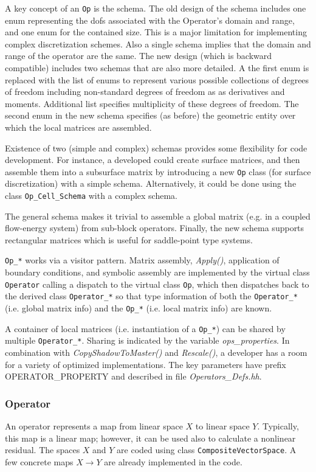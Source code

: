 A key concept of an {\tt Op} is the schema. 
The old design of the schema includes one enum representing the dofs associated
with the Operator's domain and range, and one enum for the contained size. 
This is a major limitation for implementing complex discretization schemes.
Also a single schema implies that the domain and range of the operator are the same.
The new design (which is backward compatible) includes two schemas that are also more 
detailed. A the first enum is replaced with the list of enums to represent various 
possible collections of degrees of freedom including non-standard degrees of freedom 
as as derivatives and moments.
Additional list specifies multiplicity of these degrees of freedom.
The second enum in the new schema specifies (as before) the geometric entity over which the local 
matrices are assembled.

Existence of two (simple and complex) schemas provides some flexibility for code development.
For instance, a developed could create surface matrices, and then assemble them into a 
subsurface matrix by introducing a new {\tt Op} class (for surface discretization) with a simple schema.
Alternatively, it could be done using the class {\tt Op\_Cell\_Schema} with a complex schema. 

The general schema makes it trivial to assemble a global matrix (e.g. in a coupled flow-energy system)
from sub-block operators.
Finally, the new schema supports rectangular matrices which is useful for saddle-point 
type systems.

{\tt Op\_*} works via a visitor pattern.
Matrix assembly, {\it Apply()}, application of boundary conditions, and symbolic assembly 
are implemented by the virtual class {\tt Operator} calling a dispatch to the 
virtual class {\tt Op}, which then dispatches back to the derived class {\tt Operator\_*} so that
type information of both the {\tt Operator\_*} (i.e. global matrix info) and 
the {\tt Op\_*} (i.e. local matrix info) are known.

A container of local matrices (i.e. instantiation of a {\tt Op\_*}) 
can be shared by multiple {\tt Operator\_*}. 
Sharing is indicated by the variable {\it ops\_properties}. 
In combination with {\it CopyShadowToMaster()} and {\it Rescale()},
a developer has a room for a variety of optimized implementations.
The key parameters have prefix {\rm OPERATOR\_PROPERTY} and described in file {\it Operators\_Defs.hh}.


\subsubsection{Operator}
An operator represents a map from linear space $X$ to linear space $Y$.
Typically, this map is a linear map; however, it can be used also to calculate
a nonlinear residual. 
The spaces $X$ and $Y$ are coded using class {\tt CompositeVectorSpace}.
A few concrete maps $X \to Y$ are already implemented in the code.

